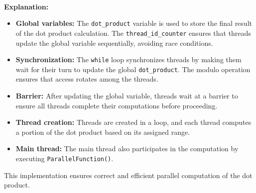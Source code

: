 \documentclass{article}
\begin{document}
\textbf{\\Explanation:}
\begin{itemize}
    \item \textbf{Global variables:} The \texttt{dot\_product} variable is used to store the final result of the dot product calculation. The \texttt{thread\_id\_counter} ensures that threads update the global variable sequentially, avoiding race conditions.
    \item \textbf{Synchronization:} The \texttt{while} loop synchronizes threads by making them wait for their turn to update the global \texttt{dot\_product}. The modulo operation ensures that access rotates among the threads.
    \item \textbf{Barrier:} After updating the global variable, threads wait at a barrier to ensure all threads complete their computations before proceeding.
    \item \textbf{Thread creation:} Threads are created in a loop, and each thread computes a portion of the dot product based on its assigned range.
    \item \textbf{Main thread:} The main thread also participates in the computation by executing \texttt{ParallelFunction()}.
\end{itemize}

This implementation ensures correct and efficient parallel computation of the dot product.
\end{document}
